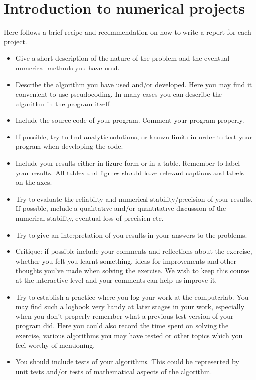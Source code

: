 \documentclass[11pt,a4wide]{article}
\begin{document}
\section*{Introduction to numerical projects}

Here follows a brief recipe and recommendation on how to write a report for each
project.
\begin{itemize}
\item Give a short description of the nature of the problem and the eventual 
numerical methods you have used.
\item Describe the algorithm you have used and/or developed. Here you may find it convenient
to use pseudocoding. In many cases you can describe the algorithm
in the program itself.

\item Include the source code of your program. Comment your program properly.
\item If possible, try to find analytic solutions, or known limits
in order to test your program when developing the code.
\item Include your results either in figure form or in a table. Remember to
       label your results. All tables and figures should have relevant captions
       and labels on the axes.
\item Try to evaluate the reliabilty and numerical stability/precision
of your results. If possible, include a qualitative and/or quantitative
discussion of the numerical stability, eventual loss of precision etc. 

\item Try to give an interpretation of you results in your answers to 
the problems.
\item Critique: if possible include your comments and reflections about the 
exercise, whether you felt you learnt something, ideas for improvements and 
other thoughts you've made when solving the exercise.
We wish to keep this course at the interactive level and your comments can help
us improve it.
\item Try to establish a practice where you log your work at the 
computerlab. You may find such a logbook very handy at later stages
in your work, especially when you don't properly remember 
what a previous test version 
of your program did. Here you could also record 
the time spent on solving the exercise, various algorithms you may have tested
or other topics which you feel worthy of mentioning.
\item You should include tests of your algorithms. This could be represented by unit tests and/or tests of mathematical aspects of the algorithm.
\end{itemize}
\end{document}
